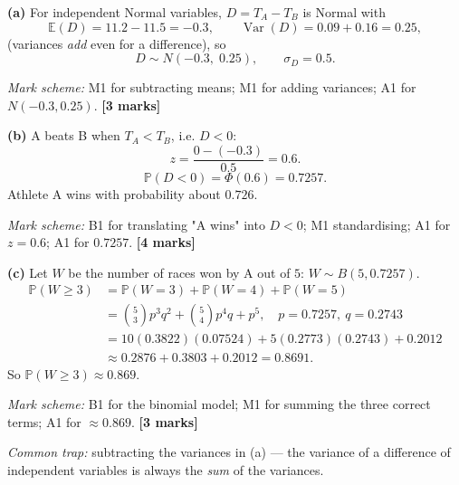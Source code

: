 \documentclass[11pt]{article}
\begin{document}
\begin{corrige}
\textbf{(a)} For independent Normal variables, $D = T_A - T_B$ is Normal with
\[
\mathbb{E}(D) = 11.2 - 11.5 = -0.3, \qquad \operatorname{Var}(D) = 0.09 + 0.16 = 0.25,
\]
(variances \emph{add} even for a difference), so
\[
D \sim N(-0.3,\; 0.25), \qquad \sigma_D = 0.5.
\]

\emph{Mark scheme:} M1 for subtracting means; M1 for adding variances; A1 for $N(-0.3, 0.25)$. \textbf{[3 marks]}

\textbf{(b)} A beats B when $T_A < T_B$, i.e. $D < 0$:
\[
z = \frac{0 - (-0.3)}{0.5} = 0.6.
\]
\[
\mathbb{P}(D < 0) = \Phi(0.6) = 0.7257.
\]
Athlete A wins with probability about $0.726$.

\emph{Mark scheme:} B1 for translating "A wins" into $D < 0$; M1 standardising; A1 for $z = 0.6$; A1 for $0.7257$. \textbf{[4 marks]}

\textbf{(c)} Let $W$ be the number of races won by A out of $5$: $W \sim B(5, 0.7257)$.
\begin{align*}
\mathbb{P}(W \ge 3) &= \mathbb{P}(W=3) + \mathbb{P}(W=4) + \mathbb{P}(W=5)\\
&= \binom{5}{3}p^3q^2 + \binom{5}{4}p^4q + p^5, \quad p = 0.7257,\ q = 0.2743\\
&= 10(0.3822)(0.07524) + 5(0.2773)(0.2743) + 0.2012\\
&\approx 0.2876 + 0.3803 + 0.2012 = 0.8691.
\end{align*}
So $\mathbb{P}(W \ge 3) \approx 0.869$.

\emph{Mark scheme:} B1 for the binomial model; M1 for summing the three correct terms; A1 for $\approx 0.869$. \textbf{[3 marks]}

\emph{Common trap:} subtracting the variances in (a) — the variance of a difference of independent variables is always the \emph{sum} of the variances.
\end{corrige}
\end{document}
